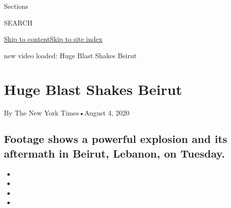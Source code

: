 Sections

SEARCH

\protect\hyperlink{site-content}{Skip to
content}\protect\hyperlink{site-index}{Skip to site index}

new video loaded: Huge Blast Shakes Beirut

\hypertarget{huge-blast-shakes-beirut}{%
\section{Huge Blast Shakes Beirut}\label{huge-blast-shakes-beirut}}

By The New York Times•August 4, 2020

\hypertarget{footage-shows-a-powerful-explosion-and-its-aftermath-in-beirut-lebanon-on-tuesday}{%
\subsection{Footage shows a powerful explosion and its aftermath in
Beirut, Lebanon, on
Tuesday.}\label{footage-shows-a-powerful-explosion-and-its-aftermath-in-beirut-lebanon-on-tuesday}}

\begin{itemize}
\item
\item
\item
\item
\end{itemize}


